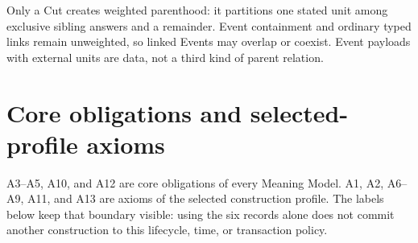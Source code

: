 \documentclass[11pt,a4paper]{article}
\begin{document}
Only a Cut creates weighted parenthood: it partitions one stated unit among
exclusive sibling answers and a remainder. Event containment and ordinary
typed links remain unweighted, so linked Events may overlap or coexist. Event
payloads with external units are data, not a third kind of parent relation.

\section{Core obligations and selected-profile axioms}

A3--A5, A10, and A12 are core obligations of every Meaning Model. A1, A2,
A6--A9, A11, and A13 are axioms of the selected construction profile. The
labels below keep that boundary visible: using the six records alone does not
commit another construction to this lifecycle, time, or transaction policy.
\end{document}

